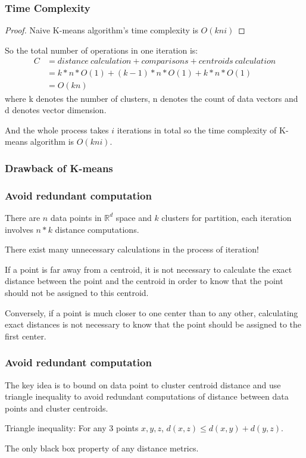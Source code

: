 \documentclass[9pt]{beamer}
\newcommand{\ccb}[1]{{\color{blue}#1}}
\newcommand{\ccp}[1]{{\color{purple}#1}}
\begin{document}
\begin{frame}
	\frametitle{Time Complexity}
	\begin{proof}
		Naive K-means algorithm's time complexity is \ccb{$O(kni)$}
	\end{proof}
	\par So the total number of operations in one iteration is:
	\begin{equation*}
		\begin{split}
			C &=  distance\ calculation + comparisons + centroids\ calculation\\
			& = k * n * O(1) + (k-1) * n * O(1) + k * n * O(1) \\
			& = O(kn)
		\end{split}
	\end{equation*}
	where k denotes the number of clusters, n denotes the count of data vectors and d denotes vector dimension.
	\par And the whole process takes $i$ iterations in total so the time complexity of K-means algorithm is \ccb{$O(kni)$}.
\end{frame}

\begin{frame}
	\frametitle{Drawback of K-means}



\end{frame}

\begin{frame}
	\frametitle{Avoid redundant computation}
	There are $n$ data points in $\mathbb{R}^ d$ space and $k$ clusters for partition, each iteration involves $n * k$ distance computations.\par
	There exist many unnecessary calculations in the process of iteration! \par
	\pause
	\par If a point is \ccp{far away from a centroid}, it is not necessary to calculate the exact distance between the point and the centroid in order to know that the point should not be assigned to this centroid.\par
	Conversely, \ccp{if a point is much closer to one center than to any other}, calculating exact distances is not necessary to know that the point should be assigned to the first center.


\end{frame}

\begin{frame}
	\frametitle{Avoid redundant computation}
	The key idea is to \ccp{bound on data point} to cluster centroid distance and use \ccp{triangle inequality} to avoid redundant computations of distance between data points and cluster centroids.
	\begin{lemma}
		Triangle inequality: For any 3 points $x, y, z$, $d(x,z) \le d(x, y) + d(y, z)$.
	\end{lemma}
	The only black box property of any distance metrics.
\end{frame}
\end{document}

